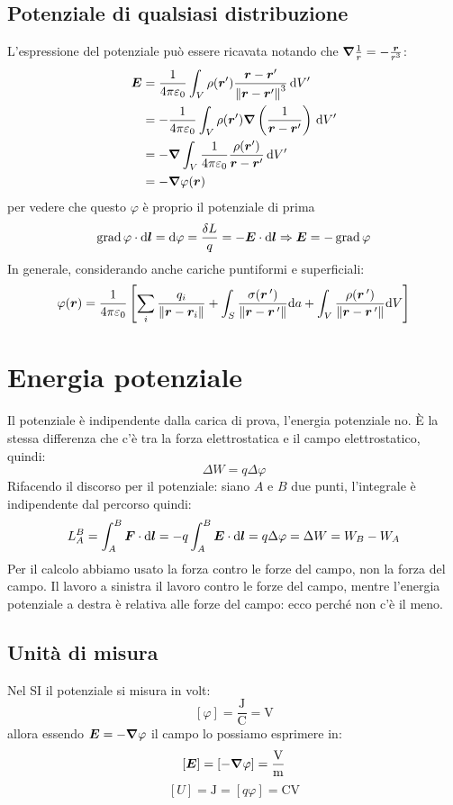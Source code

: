 \subsection{Potenziale di qualsiasi distribuzione}
L'espressione del potenziale può essere ricavata notando che $\boldsymbol{\nabla}\frac{1}{r}=-\frac{\boldsymbol{r}}{r^3}$:
\begin{equation}
  \begin{split}
    \boldsymbol{E} &= \frac{1}{4\pi\varepsilon_0}\int_V \rho(\boldsymbol{r}')\frac{\boldsymbol{r}-\boldsymbol{r}'}{\left\lVert\boldsymbol{r}-\boldsymbol{r}'\right\rVert^3}\,\mathrm{d} V'\\
    &=-\frac{1}{4\pi\varepsilon_0}\int_V \rho(\boldsymbol{r}')\boldsymbol{\nabla}\left(\frac{1}{\boldsymbol{r}-\boldsymbol{r}'}\right)\,\mathrm{d} V'\\
    &=-\boldsymbol{\nabla}\int_V \frac{1}{4\pi\varepsilon_0}\frac{\rho(\boldsymbol{r}')}{\boldsymbol{r}-\boldsymbol{r}'}\,\mathrm{d} V'\\
    &=-\boldsymbol{\nabla}\varphi(\boldsymbol{r})
  \end{split}
\end{equation}
per vedere che questo $\varphi$ è proprio il potenziale di prima
\[
  \operatorname{grad} \varphi\cdot\mathrm{d}\boldsymbol{l}=\mathrm{d} \varphi=\frac{\delta L}{q}=-\boldsymbol{E}\cdot\mathrm{d} \boldsymbol{l}\Rightarrow \boldsymbol{E}=-\operatorname{grad}\varphi
\]
In generale, considerando anche cariche puntiformi e superficiali:
\begin{equation}\varphi(\boldsymbol{r})=\frac{1}{4\pi\varepsilon_0}\left[\sum_i\frac{q_i}{\left\lVert\boldsymbol{r}-\boldsymbol{r}_i\right\rVert}+\int_S\frac{\sigma({\boldsymbol{r}}\,')}{\left\lVert\boldsymbol{r}-\boldsymbol{r}\,'\right\rVert}\mathrm{d} a+\int_V\frac{\rho({\boldsymbol{r}}\,')}{\left\lVert\boldsymbol{r}-{\boldsymbol{r}}\,'\right\rVert}\mathrm{d} V\right]\end{equation}
\section{Energia potenziale}
Il potenziale è indipendente dalla carica di prova, l'energia potenziale no. \`E la stessa differenza che c'è tra la forza elettrostatica e il campo elettrostatico, quindi:
\[\Delta W=q\Delta \varphi\]
Rifacendo il discorso per il potenziale: siano $A$ e $B$ due punti, l'integrale è indipendente dal percorso quindi:
\[L_A^B=\int_A^B \boldsymbol{F}\cdot\mathrm{d}\boldsymbol{l}=-q\int_A^B\boldsymbol{E}\cdot\mathrm{d}\boldsymbol{l}=q\Delta \varphi=\Delta W=W_B-W_A\]
Per il calcolo abbiamo usato la forza contro le forze del campo, non la forza del campo. Il lavoro a sinistra il lavoro contro le forze del campo, mentre l'energia potenziale a destra è relativa alle forze del campo: ecco perché non c'è il meno.
\subsection{Unità di misura}
Nel SI il potenziale si misura in volt:
\[[\varphi]=\frac{\si{\joule}}{\si{\coulomb}}=\si{\volt}\]
allora essendo $\boldsymbol{E}=-\boldsymbol{\nabla}\varphi$ il campo lo possiamo esprimere in:
\[[\boldsymbol{E}]=[-\boldsymbol{\nabla}\varphi]=\frac{\si{\volt}}{\si{\metre}}\]
\[[U]=\si{\joule}=[q\varphi]=\si{\coulomb\volt}\]
